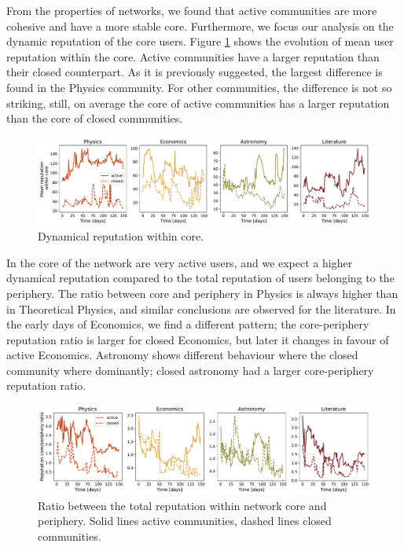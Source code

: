 From the properties of networks, we found that active communities are more cohesive and have a more stable core. Furthermore, we focus our analysis on the dynamic reputation of the core users. Figure \ref{fig:dr_core} shows the evolution of mean user reputation within the core. Active communities have a larger reputation than their closed counterpart. As it is previously suggested, the largest difference is found in the Physics community. For other communities, the difference is not so striking, still, on average the core of active communities has a larger reputation than the core of closed communities. 

\begin{figure}[h]
	\centering
	\includegraphics[width=\linewidth]{figures/stackexchange/core_reputation.pdf}
	\caption{Dynamical reputation within core.}
	\label{fig:dr_core}
\end{figure}

In the core of the network are very active users, and we expect a higher dynamical reputation compared to the total reputation of users belonging to the periphery. The ratio between core and periphery in Physics is always higher than in Theoretical Physics, and similar conclusions are observed for the literature. In the early days of Economics, we find a different pattern; the core-periphery reputation ratio is larger for closed Economics, but later it changes in favour of active Economics. Astronomy shows different behaviour where the closed community where dominantly; closed astronomy had a larger core-periphery reputation ratio. 

\begin{figure}[h!]
	\centering
	\includegraphics[width=\linewidth]{figures/stackexchange/core_per_ratio_reputation.pdf}
	\caption{Ratio between the total reputation within network core and periphery. Solid lines active communities, dashed lines closed communities.}
	\label{fig:dr_core_per}
\end{figure}

